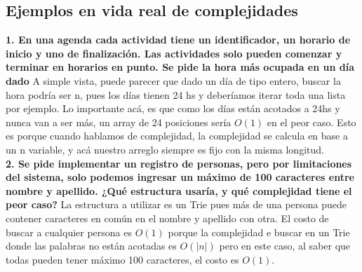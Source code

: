 \documentclass[10pt,a4paper]{article}
\begin{document}
\subsection*{Ejemplos en vida real de complejidades}
\label{subsec:ejemplos_complejidad_reales}
\textbf{1. En una agenda cada actividad tiene un identificador, un horario de inicio y uno de finalización. Las actividades solo pueden comenzar y terminar en horarios en punto. Se pide la hora más ocupada en un día dado}
A simple vista, puede parecer que dado un día de tipo entero, buscar la hora podría ser n, pues los días tienen 24 hs y deberíamos iterar toda una lista por ejemplo. Lo importante acá, es que como los días están acotados a 24hs y nunca van a ser más, un array de 24 posiciones sería $O(1)$ en el peor caso. Esto es porque cuando hablamos de complejidad, la complejidad se calcula en base a un n variable, y acá nuestro arreglo siempre es fijo con la misma longitud. \\
\textbf{2. Se pide implementar un registro de personas, pero por limitaciones del sistema, solo podemos ingresar un máximo de 100 caracteres entre nombre y apellido. ¿Qué estructura usaría, y qué complejidad tiene el peor caso?}
La estructura a utilizar es un Trie pues más de una persona puede contener caracteres en común en el nombre y apellido con otra. El costo de buscar a cualquier persona es $O(1)$ porque la complejidad e buscar en un Trie donde las palabras no están acotadas es $O(|n|)$ pero en este caso, al saber que todas pueden tener máximo 100 caracteres, el costo es $O(1)$.
\end{document}
